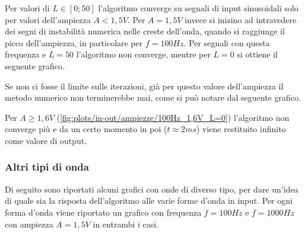 				Per valori di $L \in [0;50]$ l'algoritmo converge su segnali di input sinusoidali solo per valori dell'ampiezza $A < 1,5V$. Per $A = 1,5V$ invece si inizino ad intravedere dei segni di instabilità numerica nelle creste dell'onda, quando si raggiunge il picco dell'ampiezza, in particolare per $f = 100Hz$. Per segnali con questa frequenza e $L = 50$ l'algoritmo non converge, mentre per $L = 0$ si ottiene il seguente grafico.
				\pagebreak
				
				Se non ci fosse il limite sulle iterazioni, già per questo valore dell'ampiezza il metodo numerico non terminerebbe mai, come si può notare dal seguente grafico.
				
				Per $A \ge 1,6V$ (\ref{fig:plots/in-out/ampiezze/100Hz_1,6V_L=0}) l'algoritmo non converge più e da un certo momento in poi ($t \approx 2ms$) viene restituito infinito come valore di output.
				\pagebreak
				
				
			
			\subsubsection{Altri tipi di onda}
				Di seguito sono riportati alcuni grafici con onde di diverso tipo, per dare un'idea di quale sia la risposta dell'algoritmo alle varie forme d'onda in input. Per ogni forma d'onda viene riportato un grafico con frequenza $f = 100Hz$ e  $f = 1000Hz$ con ampiezza $A = 1,5V$ in entrambi i casi.
				
